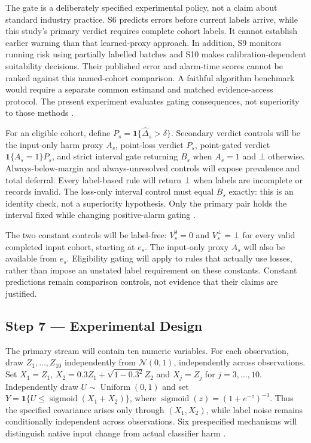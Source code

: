 \documentclass[11pt,a4paper]{article}
\newcommand{\ind}{\mathbf{1}}
\begin{document}
The gate is a deliberately specified experimental policy, not a claim about
standard industry practice. S6 predicts errors before current labels arrive,
while this study's primary verdict requires complete cohort labels.
It cannot establish earlier warning than that learned-proxy approach.
In addition, S9 monitors running risk using
partially labelled batches and S10 makes calibration-dependent suitability
decisions. Their published error and alarm-time scores cannot be ranked against
this named-cohort comparison. A faithful algorithm benchmark would require a
separate common estimand and matched evidence-access protocol. The present
experiment evaluates gating consequences, not superiority to those methods
\cite{prodem,pprm,suitability}.

For an eligible cohort, define $P_s=\ind\{\widehat\Delta_s>\delta\}$.
Secondary verdict controls will be the input-only harm proxy $A_s$, point-loss
verdict $P_s$, point-gated verdict $\ind\{A_s=1\}P_s$, and strict interval
gate returning $B_s$ when $A_s=1$ and $\bot$ otherwise. Always-below-margin
and always-unresolved controls will expose prevalence and total deferral.
Every label-based rule will return $\bot$ when labels are incomplete or records
invalid. The loss-only interval control must equal $B_s$ exactly: this is an
identity check, not a superiority hypothesis. Only the primary pair holds the
interval fixed while changing positive-alarm gating \cite{selective}.

The two constant controls will be label-free: $V_s^0=0$ and
$V_s^\bot=\bot$ for every valid completed input cohort, starting at $e_s$.
The input-only proxy $A_s$ will also be available from $e_s$. Eligibility
gating will apply to rules that actually use losses, rather than impose an
unstated label requirement on these constants. Constant predictions remain
comparison controls, not evidence that their claims are justified.

\subsection*{Step 7 --- Experimental Design}
The primary stream will contain ten numeric variables. For each observation,
draw $Z_1,\ldots,Z_{10}$ independently from $\mathcal N(0,1)$, independently
across observations. Set $X_1=Z_1$,
$X_2=0.3Z_1+\sqrt{1-0.3^2}Z_2$ and $X_j=Z_j$ for $j=3,\ldots,10$.
Independently draw $U\sim\operatorname{Uniform}(0,1)$ and set
$Y=\ind\{U\leq\operatorname{sigmoid}(X_1+X_2)\}$, where
$\operatorname{sigmoid}(z)=(1+e^{-z})^{-1}$. Thus the specified covariance
arises only through $(X_1,X_2)$, while label noise remains conditionally
independent across observations.
Six prespecified mechanisms will distinguish native input change from actual
classifier harm \cite{cerqueira,window}.
\end{document}
